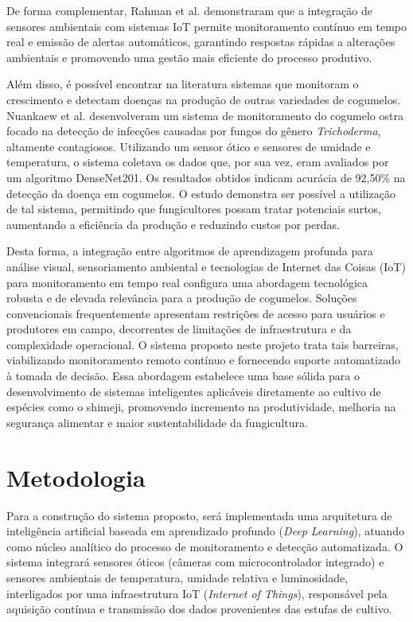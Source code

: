 \documentclass[11pt,a4paper]{article}
\begin{document}
De forma complementar, Rahman et al. \cite{Rahman2021} demonstraram que a integração de sensores ambientais com sistemas IoT permite monitoramento contínuo em tempo real e emissão de alertas automáticos, garantindo respostas rápidas a alterações ambientais e promovendo uma gestão mais eficiente do processo produtivo.

Além disso, é possível encontrar na literatura sistemas que monitoram o crescimento e detectam doenças na produção de outras variedades de cogumelos. Nuankaew et al. \cite{Nuankaew2025} desenvolveram um sistema de monitoramento do cogumelo ostra focado na detecção de infecções causadas por fungos do gênero \textit{Trichoderma}, altamente contagiosos. Utilizando um sensor ótico e sensores de umidade e temperatura, o sistema coletava os dados que, por sua vez, eram avaliados por um algoritmo DenseNet201. Os resultados obtidos indicam acurácia de 92,50\% na detecção da doença em cogumelos. O estudo demonstra ser possível a utilização de tal sistema, permitindo que fungicultores possam tratar potenciais surtos, aumentando a eficiência da produção e reduzindo custos por perdas.

Desta forma, a integração entre algoritmos de aprendizagem profunda para análise visual, sensoriamento ambiental e tecnologias de Internet das Coisas (IoT) para monitoramento em tempo real configura uma abordagem tecnológica robusta e de elevada relevância para a produção de cogumelos. Soluções convencionais frequentemente apresentam restrições de acesso para usuários e produtores em campo, decorrentes de limitações de infraestrutura e da complexidade operacional. O sistema proposto neste projeto trata tais barreiras, viabilizando monitoramento remoto contínuo e fornecendo suporte automatizado à tomada de decisão. Essa abordagem estabelece uma base sólida para o desenvolvimento de sistemas inteligentes aplicáveis diretamente ao cultivo de espécies como o shimeji, promovendo incremento na produtividade, melhoria na segurança alimentar e maior sustentabilidade da fungicultura.

\section{Metodologia}

Para a construção do sistema proposto, será implementada uma arquitetura de inteligência artificial baseada em aprendizado profundo (\textit{Deep Learning}), atuando como núcleo analítico do processo de monitoramento e detecção automatizada. O sistema integrará sensores óticos (câmeras com microcontrolador integrado) e sensores ambientais de temperatura, umidade relativa e luminosidade, interligados por uma infraestrutura IoT (\textit{Internet of Things}), responsável pela aquisição contínua e transmissão dos dados provenientes das estufas de cultivo.
\end{document}
